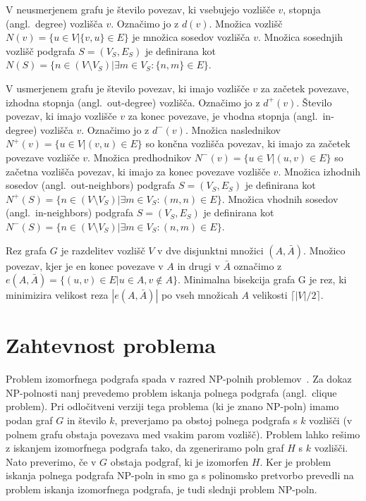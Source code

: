 \documentclass[a4paper, 12pt, ]{book}
\begin{document}
	V neusmerjenem grafu je število povezav, ki vsebujejo vozlišče $v$, stopnja (angl.~degree) vozlišča $v$. Označimo jo z $d(v)$. Množica vozlišč
	$N(v) = \{u \in V \big| \{v, u\} \in E\}$ je množica sosedov vozlišča $v$. 
	Množica sosednjih vozlišč podgrafa $S = (V_S, E_S)$ je definirana kot 
	$N(S) = \{ n \in (V \setminus V_S) \big| \exists m \in V_S : \{n,m\} \in E \}$. 

	V usmerjenem grafu je število povezav, ki imajo vozlišče $v$ za začetek
	povezave, 	izhodna stopnja (angl.~out-degree) vozlišča. Označimo jo z $d^+(v)$.
	Število povezav, ki imajo vozlišče $v$ za konec povezave, je vhodna stopnja (angl.~in-degree) vozlišča $v$. Označimo jo z $d^-(v)$.
	Množica naslednikov
	$N^+(v) = \{u \in V \big| (v,u) \in E\}$
	so končna vozlišča povezav, ki imajo za začetek povezave vozlišče $v$.
	Množica predhodnikov 
	$N^-(v) = \{u \in V \big| (u,v) \in E\}$
	so začetna vozlišča povezav, ki imajo za konec povezave vozlišče $v$. 
	Množica izhodnih sosedov (angl.~out-neighbors) podgrafa $S = (V_S, E_S)$ je definirana kot 
	$N^+(S) = \{ n \in (V \setminus V_S) \big| \exists m \in V_S : (m,n) \in E \}$.
	Množica vhodnih sosedov (angl.~in-neighbors) podgrafa $S = (V_S, E_S)$ je definirana kot 
	$N^-(S) = \{ n \in (V \setminus V_S) \big| \exists m \in V_S : (n,m) \in E \}$.

	Rez grafa $G$ je razdelitev vozlišč $V$ v dve disjunktni množici $(A, \bar A)$. Množico povezav, kjer je en konec povezave v $A$ in drugi v
	 $\bar A$ označimo z $e(A, \bar A) = \{(u,v) \in E \big| u \in A, v \not \in A\}$. Minimalna bisekcija  grafa G je rez, ki minimizira velikost reza 
	$| e(A, \bar A) |$ po vseh množicah $A$ velikosti $\lceil | V | / 2 \rceil$.



	\section{Zahtevnost problema}
	Problem izomorfnega podgrafa spada v razred NP-polnih problemov~\cite{npcomplete}. Za dokaz NP-polnosti nanj prevedemo problem
	iskanja polnega podgrafa (angl.~clique problem). Pri odločitveni verziji tega problema (ki je znano NP-poln) imamo podan graf $G$ in število $k$,
	preverjamo pa obstoj polnega podgrafa s $k$ vozlišči (v polnem grafu obstaja povezava med vsakim parom vozlišč). Problem lahko rešimo z iskanjem
	izomorfnega podgrafa tako, da zgeneriramo poln graf $H$ s $k$ vozlišči. Nato preverimo, če v $G$ obstaja podgraf, ki je izomorfen $H$. Ker
	je problem iskanja polnega podgrafa NP-poln in smo ga s polinomsko pretvorbo prevedli na problem iskanja izomorfnega podgrafa, je tudi slednji
	problem NP-poln.
\end{document}
